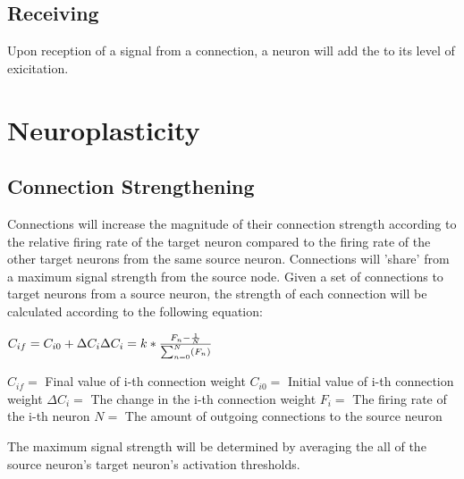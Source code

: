 \documentclass{article} %
\begin{document}
        \subsection{Receiving} Upon reception of a signal from a connection, a neuron will add the to its level of exicitation.\newline


    \section{Neuroplasticity}
        
        \subsection{Connection Strengthening}
            Connections will increase the magnitude of their connection strength according to the relative firing rate of the target neuron compared to the firing rate of the other target neurons from the same source neuron. Connections will 'share' from a maximum signal strength from the source node.\newline
            Given a set of connections to target neurons from a source neuron, the strength of each connection will be calculated according to the following equation:\newline
            \begin{center}
            \begin{math}
                C_{if} = C_{i0} + \Delta C_{i}\newline
                \Delta C_i = k * \frac{F_n - \frac{1}{N}}{\sum_{n=0}^{N} (F_n)}\newline\newline
            \end{math}
            \end{center}
                $C_{if} = $ Final value of i-th connection weight\newline
                $C_{i0} = $ Initial value of i-th connection weight\newline
                $\Delta C_{i} = $ The change in the i-th connection weight\newline
                $F_{i} = $ The firing rate of the i-th neuron\newline
                $N = $ The amount of outgoing connections to the source neuron\newline

            The maximum signal strength will be determined by averaging the all of the source neuron's target neuron's activation thresholds.
        
\end{document}
